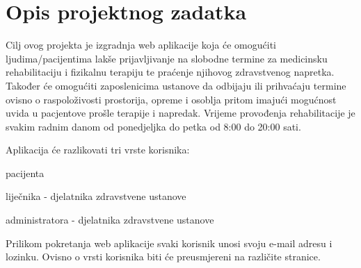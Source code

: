 
\chapter{Opis projektnog zadatka}
		
		Cilj ovog projekta je izgradnja web aplikacije koja će omogućiti ljudima/pacijentima lakše prijavljivanje na slobodne termine za medicinsku rehabilitaciju i fizikalnu terapiju te praćenje njihovog zdravstvenog napretka. Također će omogućiti zaposlenicima ustanove da odbijaju ili prihvaćaju termine ovisno o raspoloživosti prostorija, opreme i osoblja pritom imajući mogućnost uvida u pacjentove prošle terapije i napredak. Vrijeme provođenja rehabilitacije je svakim radnim danom od ponedjeljka do petka od 8:00 do 20:00 sati.
		
		\noindent Aplikacija će razlikovati tri vrste korisnika: 
		\begin{packed_item}
			
			\item  pacijenta
			\item  liječnika - djelatnika zdravstvene ustanove
			\item  administratora - djelatnika zdravstvene ustanove
		\end{packed_item}
		
		Prilikom pokretanja web aplikacije svaki korisnik unosi svoju e-mail adresu i lozinku. Ovisno o vrsti korisnika biti će preusmjereni na različite stranice.
		
